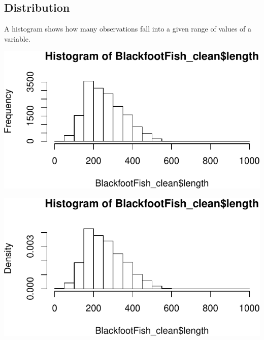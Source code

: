 \documentclass[]{article}
\newenvironment{Shaded}{\begin{snugshade}}{\end{snugshade}}
\newcommand{\KeywordTok}[1]{\textcolor[rgb]{0.13,0.29,0.53}{\textbf{#1}}}
\newcommand{\DataTypeTok}[1]{\textcolor[rgb]{0.13,0.29,0.53}{#1}}
\newcommand{\OperatorTok}[1]{\textcolor[rgb]{0.81,0.36,0.00}{\textbf{#1}}}
\newcommand{\NormalTok}[1]{#1}
\begin{document}
\subsection{Distribution}\label{distribution}

A histogram shows how many observations fall into a given range of
values of a variable.

\vspace{0.25cm}

\begin{Shaded}
\end{Shaded}

\begin{center}\includegraphics{RTutorial_files/figure-latex/hist1-1} \end{center}

\newpage

\begin{Shaded}
\end{Shaded}

\begin{center}\includegraphics{RTutorial_files/figure-latex/hist2-1} \end{center}
\end{document}

